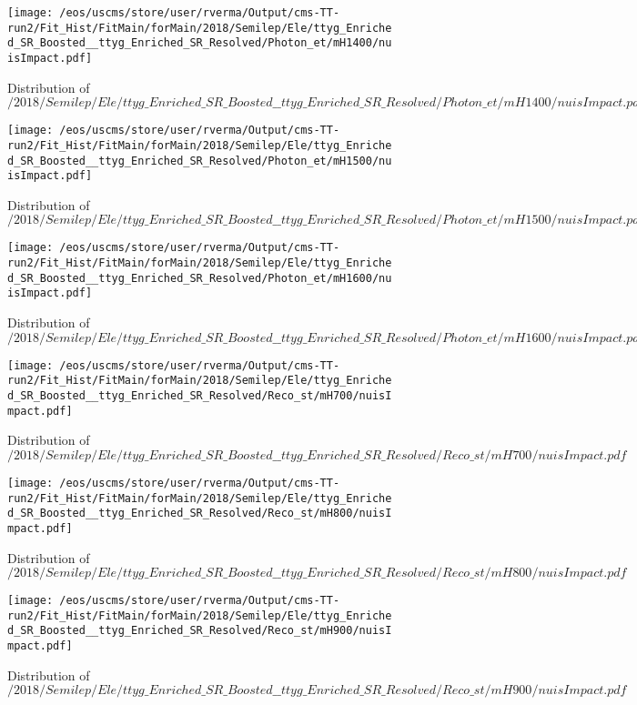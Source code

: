 \begin{figure}
\centering
\texttt{[image: /eos/uscms/store/user/rverma/Output/cms-TT-run2/Fit\_Hist/FitMain/forMain/2018/Semilep/Ele/ttyg\_Enriched\_SR\_Boosted\_\_ttyg\_Enriched\_SR\_Resolved/Photon\_et/mH1400/nuisImpact.pdf]}
\caption{Distribution of $/2018/Semilep/Ele/ttyg\_Enriched\_SR\_Boosted\_\_ttyg\_Enriched\_SR\_Resolved/Photon\_et/mH1400/nuisImpact.pdf$}
\end{figure}

\begin{figure}
\centering
\texttt{[image: /eos/uscms/store/user/rverma/Output/cms-TT-run2/Fit\_Hist/FitMain/forMain/2018/Semilep/Ele/ttyg\_Enriched\_SR\_Boosted\_\_ttyg\_Enriched\_SR\_Resolved/Photon\_et/mH1500/nuisImpact.pdf]}
\caption{Distribution of $/2018/Semilep/Ele/ttyg\_Enriched\_SR\_Boosted\_\_ttyg\_Enriched\_SR\_Resolved/Photon\_et/mH1500/nuisImpact.pdf$}
\end{figure}

\begin{figure}
\centering
\texttt{[image: /eos/uscms/store/user/rverma/Output/cms-TT-run2/Fit\_Hist/FitMain/forMain/2018/Semilep/Ele/ttyg\_Enriched\_SR\_Boosted\_\_ttyg\_Enriched\_SR\_Resolved/Photon\_et/mH1600/nuisImpact.pdf]}
\caption{Distribution of $/2018/Semilep/Ele/ttyg\_Enriched\_SR\_Boosted\_\_ttyg\_Enriched\_SR\_Resolved/Photon\_et/mH1600/nuisImpact.pdf$}
\end{figure}

\begin{figure}
\centering
\texttt{[image: /eos/uscms/store/user/rverma/Output/cms-TT-run2/Fit\_Hist/FitMain/forMain/2018/Semilep/Ele/ttyg\_Enriched\_SR\_Boosted\_\_ttyg\_Enriched\_SR\_Resolved/Reco\_st/mH700/nuisImpact.pdf]}
\caption{Distribution of $/2018/Semilep/Ele/ttyg\_Enriched\_SR\_Boosted\_\_ttyg\_Enriched\_SR\_Resolved/Reco\_st/mH700/nuisImpact.pdf$}
\end{figure}

\begin{figure}
\centering
\texttt{[image: /eos/uscms/store/user/rverma/Output/cms-TT-run2/Fit\_Hist/FitMain/forMain/2018/Semilep/Ele/ttyg\_Enriched\_SR\_Boosted\_\_ttyg\_Enriched\_SR\_Resolved/Reco\_st/mH800/nuisImpact.pdf]}
\caption{Distribution of $/2018/Semilep/Ele/ttyg\_Enriched\_SR\_Boosted\_\_ttyg\_Enriched\_SR\_Resolved/Reco\_st/mH800/nuisImpact.pdf$}
\end{figure}

\begin{figure}
\centering
\texttt{[image: /eos/uscms/store/user/rverma/Output/cms-TT-run2/Fit\_Hist/FitMain/forMain/2018/Semilep/Ele/ttyg\_Enriched\_SR\_Boosted\_\_ttyg\_Enriched\_SR\_Resolved/Reco\_st/mH900/nuisImpact.pdf]}
\caption{Distribution of $/2018/Semilep/Ele/ttyg\_Enriched\_SR\_Boosted\_\_ttyg\_Enriched\_SR\_Resolved/Reco\_st/mH900/nuisImpact.pdf$}
\end{figure}

